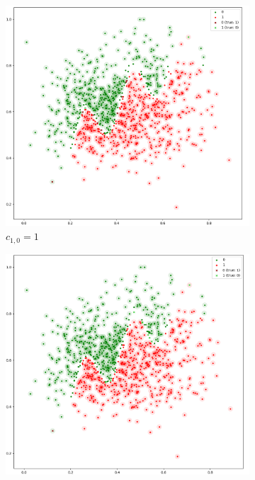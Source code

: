 \documentclass[acmsmall,nonacm]{acmart}
\begin{document}
\begin{figure}[H]
  \begin{subfigure}[b]{0.32\textwidth}
      \includegraphics[width=\textwidth]{assets/b-val-cost1-eps0_01}
      \caption{$c_{1, 0} = 1$}
    \end{subfigure}
  \begin{subfigure}[b]{0.32\textwidth}
      \includegraphics[width=\textwidth]{assets/b-val-cost10-eps0_01}

\end{subfigure}
\end{figure}
\end{document}
